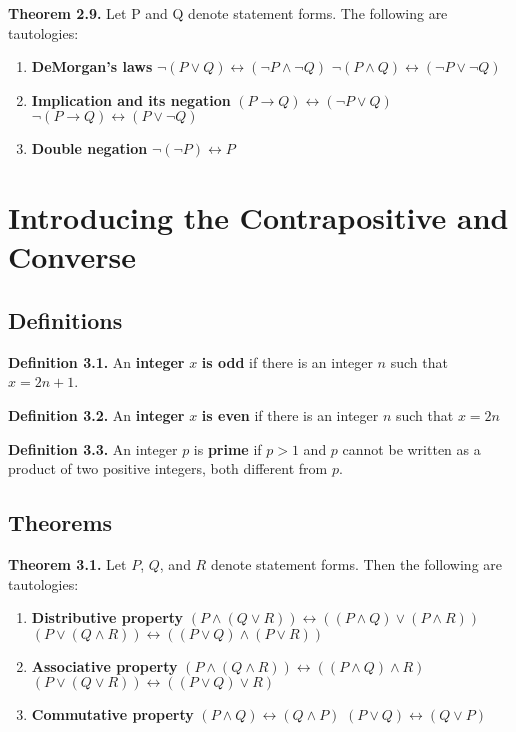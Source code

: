 \documentclass{article}
\begin{document}
\textbf{Theorem 2.9.}
Let P and Q denote statement forms. The following are tautologies:
\begin{enumerate}
	\item \textbf{DeMorgan's laws}
	\subitem  $\lnot(P \lor Q) \leftrightarrow (\lnot P \land \lnot Q)$
	\subitem  $\lnot(P \land Q) \leftrightarrow (\lnot P \lor \lnot Q)$
	\item \textbf{Implication and its negation}
	\subitem $(P \rightarrow Q) \leftrightarrow (\lnot P \lor Q)$
	\subitem $\lnot(P \rightarrow Q) \leftrightarrow (P \lor \lnot Q)$
	\item \textbf{Double negation}
	\subitem $\lnot(\lnot P) \leftrightarrow P$
\end{enumerate} 


\pagebreak
\section{Introducing the Contrapositive and Converse}
\subsection{Definitions}
\textbf{Definition 3.1.} An \textbf{integer} $x$ \textbf{is odd} if there is an integer $n$ such that $x = 2n +1$.

\textbf{Definition 3.2.} An \textbf{integer} $x$ \textbf{is even} if there is an integer $n$ such that $x = 2n$

\textbf{Definition 3.3.} An integer $p$ is \textbf{prime} if $p > 1$ and $p$ cannot be written as a product of two positive integers, both different from $p$.


\subsection{Theorems}
\textbf{Theorem 3.1.} Let $P$, $Q$, and $R$ denote statement forms. Then the following are tautologies:
\begin{enumerate}
	\item \textbf{Distributive property}
		\subitem  $(P \land (Q \lor R)) \leftrightarrow ((P \land Q) \lor (P \land R))$
		\subitem  $(P \lor (Q \land R)) \leftrightarrow ((P \lor Q) \land (P \lor R))$
	\item \textbf{Associative property}
		\subitem $(P \land (Q \land R)) \leftrightarrow ((P \land Q) \land R)$
		\subitem $(P \lor (Q \lor R)) \leftrightarrow ((P \lor Q) \lor R)$

	\item \textbf{Commutative property}
		\subitem  $(P \land Q) \leftrightarrow (Q \land P)$
		\subitem  $(P \lor Q) \leftrightarrow (Q \lor P)$
\end{enumerate} 
\end{document}
